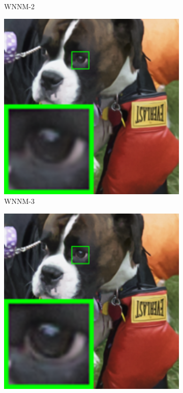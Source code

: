 \begin{figure}
\begin{subfigure}[t]{0.19\textwidth}
		\caption{WNNM-2}
    \end{subfigure}
    \hfill
    \begin{subfigure}[t]{0.19\textwidth}
        \centering
        \includegraphics[width=1\textwidth]{images/mcwnnm/nc/resize_br_WNNM_ADMM_dog.png}
		\caption{WNNM-3}
    \end{subfigure}
    \hfill
    \begin{subfigure}[t]{0.19\textwidth}
        \centering
        \includegraphics[width=1\textwidth]{images/mcwnnm/nc/resize_br_CWNNM_ADMM_NL_dog.png}

\end{subfigure}
\end{figure}
